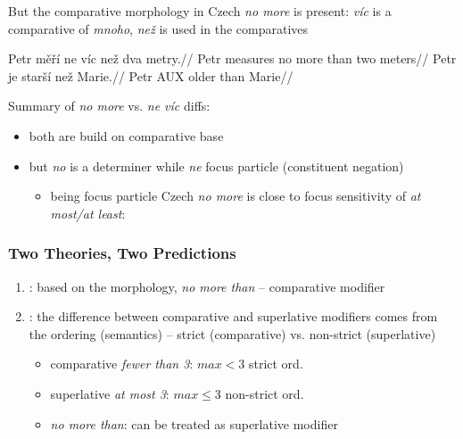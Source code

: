 \documentclass[10pt
]{beamer}
\begin{document}
\begin{frame}

But the comparative morphology in Czech \textit{no more} is present: \textit{víc} is a comparative of \textit{mnoho}, \textit{než} is used in the comparatives


\pex \a 
\begingl
\gla Petr měří ne víc než dva metry.//
\glb Petr measures no more than two meters//
\endgl
\a  
\begingl
\gla Petr je starší než Marie.//
\glb Petr AUX older than Marie//
\endgl
\xe

Summary of \textit{no more} vs. \textit{ne víc} diffs: 

\begin{itemize}
  \item both are build on comparative base
  \item but \textit{no} is a determiner while \textit{ne} focus particle (constituent negation)
  
  \begin{itemize}
    \item being focus particle Czech \textit{no more} is close to focus sensitivity of \textit{at most/at least}: \cite{cohen2011superlative,coppock2013raising}
  \end{itemize}

\end{itemize}
 

\end{frame}

\begin{frame}
  \frametitle{Two Theories, Two Predictions}

\begin{enumerate}
  \item \cite{nouwen2008upper,nouwen2010two}: based on the morphology, \textit{no more than} -- comparative modifier
  \item \cite{kennedy2015fregean}: the difference between comparative and superlative modifiers comes from the ordering (semantics) -- strict (comparative) vs. non-strict (superlative)
  \begin{itemize}
    \item comparative \textit{fewer than 3}: $max < 3$ \hfill strict ord.
    \item superlative \textit{at most 3}: $max \leq 3$ \hfill non-strict ord.
    \item \textit{no more than}: can be treated as superlative modifier
  \end{itemize}
\end{enumerate}  
  

\end{frame}
\end{document}
